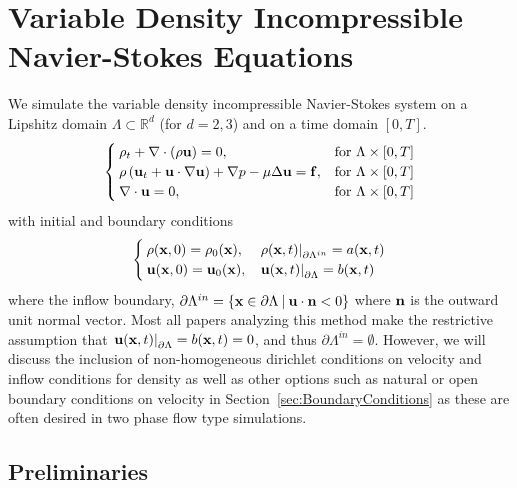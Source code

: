\documentclass[letterpaper]{erdc}
\begin{document}
\chapter{Variable Density Incompressible Navier-Stokes Equations}\label{ch:vardensity_navierstokes_description}
We simulate the variable density incompressible Navier-Stokes system on a Lipshitz domain $\Lambda\subset \mathbb{R}^d$ (for $d=2,3$) and on a time domain $[0,T]$.
\begin{equation}\label{eqn:variabledensityNavierStokes}
  \begin{cases}
    \rho_t + \nabla\cdot\left( \rho \textbf{u}\right) = 0, & \mbox{for }\Lambda\times[0,T]\\
    \rho\left(\textbf{u}_t + \textbf{u}\cdot\nabla\textbf{u}  \right) + \nabla p - \mu\Delta \textbf{u} = \mathbf{f}, &\mbox{for }\Lambda\times[0,T]\\
    \nabla\cdot \textbf{u} = 0, &\mbox{for } \Lambda\times[0,T]
  \end{cases}
\end{equation}
with initial and boundary conditions
\begin{equation}\label{eqn:variabledensityNavierStokesBCIC}
  \begin{cases}
    \rho(\textbf{x},0) = \rho_0(\textbf{x}), & \left.\rho(\textbf{x},t)\right|_{\partial\Lambda^{in}} = a(\textbf{x},t)\\
    \textbf{u}(\textbf{x},0) = \textbf{u}_0(\textbf{x}), & \left.\textbf{u}(\textbf{x},t)\right|_{\partial\Lambda} = b(\textbf{x},t)
  \end{cases}
\end{equation}
where the inflow boundary, $\partial\Lambda^{in} = \{ \textbf{x}\in \partial\Lambda \:|\: \textbf{u}\cdot\textbf{n} <0 \}$ where $\textbf{n}$ is the outward unit normal vector.  Most all papers analyzing this method make the restrictive assumption that $\left.\textbf{u}(\textbf{x},t)\right|_{\partial\Lambda} = b(\textbf{x},t) = 0$, and thus $\partial\Lambda^{in}= \emptyset$.  However, we will discuss the inclusion of non-homogeneous dirichlet conditions on velocity and inflow conditions for density as well as other options such as natural or open boundary conditions on velocity in Section~\ref{sec:BoundaryConditions} as these are often desired in two phase flow type simulations.


%
%
%
\section{Preliminaries}


%
%
\end{document}

